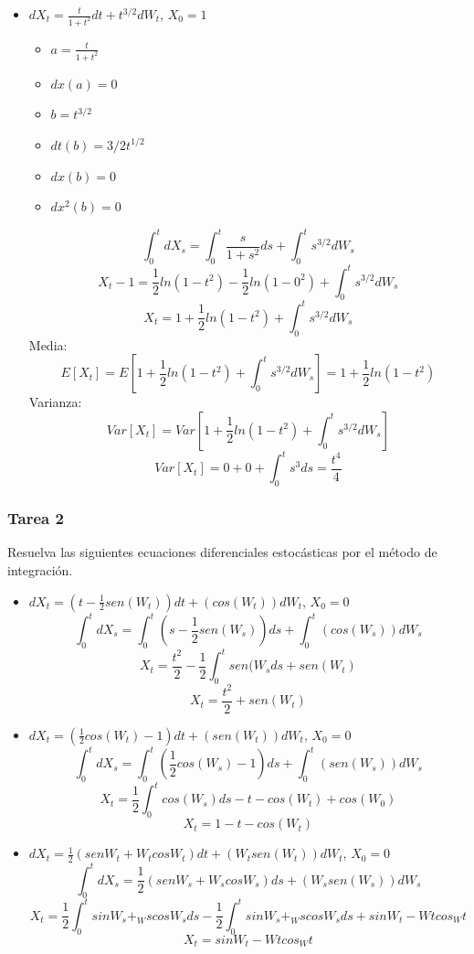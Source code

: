 \documentclass[11pt,fleqn]{book} %
\numberwithin{equation}{section} %
\numberwithin{figure}{section} %
\numberwithin{table}{section} %
\begin{document}
\begin{itemize}
    \item $dX_{t} = \frac{t}{1 + t^2} dt + t^{3/2} dW_{t}$, $X_{0} = 1$
    \begin{itemize}
        \item $a = \frac{t}{1+t^{2}}$
        \item $dx (a) = 0 $
        \item $b = t^{3/2} $
        \item $dt (b) = 3/2 t^{1/2}  $
        \item $dx (b) = 0$
        \item $dx^{2} (b) = 0 $
    \end{itemize}
    $$ \int_{0}^{t} dX_{s} = \int_{0}^{t} \frac{s}{1 + s^2} ds + \int_{0}^{t} s^{3/2} dW_{s}    $$
    $$ X_{t} - 1 = \frac{1}{2} ln (1-t^{2}) - \frac{1}{2} ln (1-0^{2}) + \int_{0}^{t} s^{3/2} dW_{s}    $$
    $$ X_{t} = 1 + \frac{1}{2} ln (1-t^{2}) + \int_{0}^{t} s^{3/2} dW_{s}    $$
    Media:
    $$ E[X_{t}] = E[1 + \frac{1}{2} ln (1-t^{2}) + \int_{0}^{t} s^{3/2} dW_{s}] = 1 + \frac{1}{2} ln (1-t^{2}) $$
    Varianza:
    $$ Var[X_{t}] = Var[1 + \frac{1}{2} ln (1-t^{2}) + \int_{0}^{t} s^{3/2} dW_{s}]       $$
    $$ Var[X_{t}] = 0 + 0 + \int_{0}^{t} s^{3} ds = \frac{t^{4}}{4}       $$
\end{itemize}
\subsubsection{Tarea 2}
Resuelva las siguientes ecuaciones diferenciales estocásticas por el método de integración.
\begin{itemize}
    \item $dX_{t} = (t - \frac{1}{2} sen(W_{t}))dt + (cos(W_{t}))dW_{t}$, $X_{0} = 0$
    $$ \int_{0}^{t} dX_{s} = \int_{0}^{t} (s - \frac{1}{2} sen(W_{s}))ds + \int_{0}^{t} (cos(W_{s}))dW_{s}$$
    $$ X_{t} =  \frac{t^2}{2} - \frac{1}{2} \int_{0}^{t} sen(W_{s} ds + sen(W_{t})   $$
    $$ X_{t} =  \frac{t^2}{2} + sen(W_{t})   $$
    \item $dX_{t} = (\frac{1}{2} cos(W_{t}) - 1)dt + (sen(W_{t}))dW_{t}$, $X_{0} = 0$
    $$ \int_{0}^{t} dX_{s} = \int_{0}^{t} (\frac{1}{2} cos(W_{s}) - 1)ds + \int_{0}^{t} (sen(W_{s}))dW_{s}$$
    $$ X_{t} = \frac{1}{2} \int_{0}^{t} cos(W_{s}) ds - t - cos(W_{t}) + cos(W_{0})   $$
    $$ X_{t} = 1 - t - cos(W_{t})   $$
    \item $dX_{t} = \frac{1}{2}(senW_{t} + W_{t}cosW_{t})dt + (W_{t}sen(W_{t}))dW_{t}$, $X_{0} = 0$
    $$\int_{0}^{t} dX_{s} = \frac{1}{2}(senW_{s} + W_{s}cosW_{s})ds + (W_{s}sen(W_{s}))dW_{s}$$
    $$ X_{t} = \frac{1}{2} \int_{0}^{t} sinW_{s} + _W{s} cosW_{s} ds - \frac{1}{2} \int_{0}^{t} sinW_{s} + _W{s} cosW_{s} ds + sinW_{t} - W{t}cos_W{t}  $$
    $$ X_{t} = sinW_{t} - W{t}cos_W{t}  $$
\end{itemize}
\end{document}
